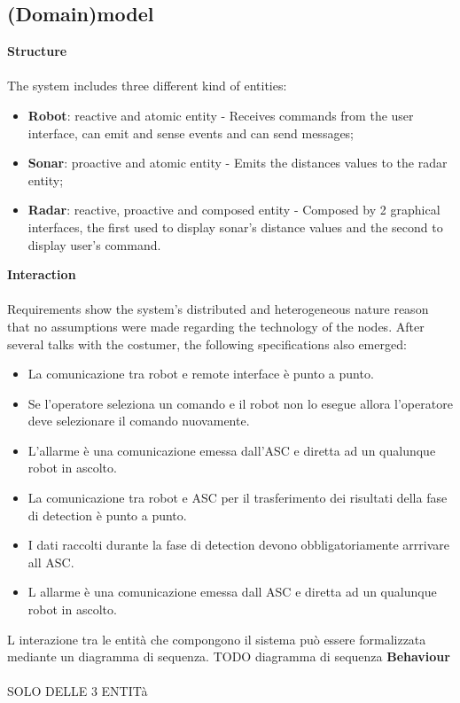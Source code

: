 \subsection{(Domain)model}
\textbf{Structure} \\\\
The system includes three different kind of entities:
\begin{itemize}
	\item \textbf{Robot}: reactive and atomic entity - Receives commands from the user interface, can emit and sense events and can send messages;
	\item \textbf{Sonar}: proactive and atomic entity - Emits the distances values to the radar entity;
	\item \textbf{Radar}: reactive, proactive and composed entity - Composed by 2 graphical interfaces, the first used to display sonar's distance values and the second to display user's command.
\end{itemize}
\textbf{Interaction} \\\\
Requirements show the system's distributed and heterogeneous nature reason that no assumptions were made regarding the technology of the nodes. After several talks with the costumer, the following specifications also emerged: 
\begin{itemize}
	\item La comunicazione tra robot e remote interface è punto a punto.
	\item Se l'operatore seleziona un comando e il robot non lo esegue allora l’operatore deve selezionare il comando nuovamente.
	\item L'allarme è una comunicazione emessa dall'ASC e diretta ad un qualunque robot in ascolto.
	\item La comunicazione tra robot e ASC per il trasferimento dei risultati della fase di detection è punto a punto.
	\item I dati raccolti durante la fase di detection devono obbligatoriamente arrrivare all ASC.
	\item L allarme è una comunicazione emessa dall ASC e diretta ad un qualunque robot in ascolto.
\end{itemize}
L interazione tra le entità che compongono il sistema può essere formalizzata mediante un diagramma di sequenza.
TODO diagramma di sequenza
\textbf{Behaviour} \\\\
SOLO DELLE 3 ENTITà